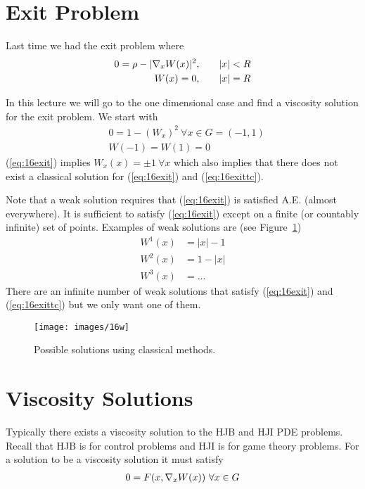 \mainmatter%
\setcounter{page}{1}

\lectureseries[\course]{\course}

\date{November 24, 2009}

\setaddress%

\setcounter{lecture}{15}
\setcounter{chapter}{15}


\section{Exit Problem}
Last time we had the exit problem where
\begin{align*}
0 = \rho - |\nabla_xW(x)|^2, &\qquad |x|<R \\
W(x) = 0, &\qquad |x|=R
\end{align*}

In this lecture we will go to the one dimensional case and find a viscosity solution for the exit problem.
We start with
\begin{align}
\label{eq:16exit}
&0 = 1-{(W_x)}^2~\forall x\in G=(-1,1) \\
\label{eq:16exittc}
&W(-1) = W(1) = 0
\end{align}
(\ref{eq:16exit}) implies $W_x(x)=\pm1~\forall x$ which also implies that there does not exist a classical solution for (\ref{eq:16exit}) and (\ref{eq:16exittc}).

Note that a weak solution requires that (\ref{eq:16exit}) is satisfied A.E. (almost everywhere).
It is sufficient to satisfy (\ref{eq:16exit}) except on a finite (or countably infinite) set of points.
Examples of weak solutions are (see Figure~\ref{fig:16w})
\begin{align*}
W^1(x) &= |x|-1 \\
W^2(x) &= 1-|x| \\
W^3(x) &= \ldots
\end{align*}
There are an infinite number of weak solutions that satisfy (\ref{eq:16exit}) and (\ref{eq:16exittc}) but we only want one of them.

\begin{figure}[ht!]
\centering
\texttt{[image: images/16w]}
\caption{Possible solutions using classical methods.}%
\label{fig:16w}
\end{figure}

\section{Viscosity Solutions}
Typically there exists a viscosity solution to the HJB and HJI PDE problems.
Recall that HJB is for control problems and HJI is for game theory problems.
For a solution to be a viscosity solution it must satisfy
\begin{align}
\label{eq:16vsf}
0 = F(x,\nabla_xW(x))~\forall x\in G
\end{align}

